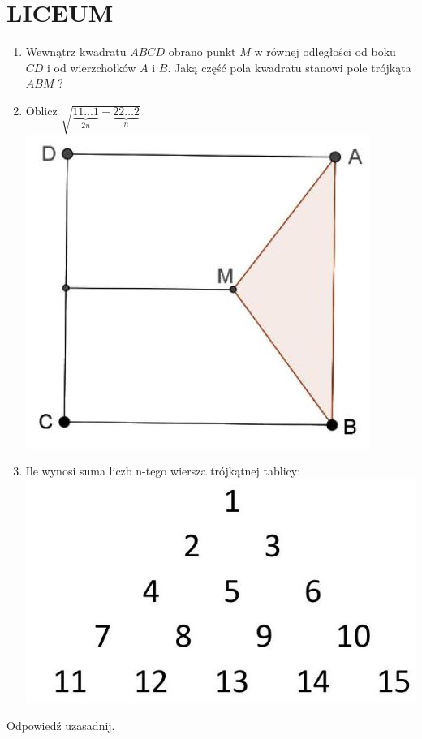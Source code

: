 \documentclass[10pt]{article}
\begin{document}
\section*{LICEUM}
\begin{enumerate}
  \item Wewnątrz kwadratu \(A B C D\) obrano punkt \(M\) w równej odległości od boku \(C D\) i od wierzchołków \(A\) i \(B\). Jaką część pola kwadratu stanowi pole trójkąta \(A B M\) ?
  \item Oblicz \(\sqrt{\underbrace{11 \ldots 1}_{2 n}-\underbrace{22 \ldots 2}_{n}}\)\\
\includegraphics[max width=\textwidth, center]{2024_11_21_17a8ac2904543f8d31ceg-1(1)}
  \item Ile wynosi suma liczb n-tego wiersza trójkątnej tablicy:\\
\includegraphics[max width=\textwidth, center]{2024_11_21_17a8ac2904543f8d31ceg-1}
\end{enumerate}

Odpowiedź uzasadnij.
\end{document}
